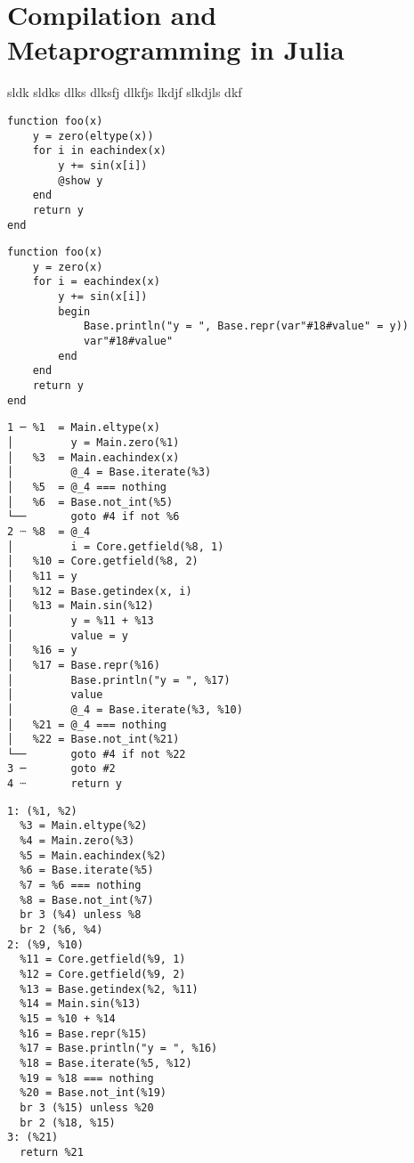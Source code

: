 \section{Compilation and Metaprogramming in Julia}
\label{sec:comp-metapr-julia}

sldk sldks dlks dlksfj dlkfjs lkdjf slkdjls dkf

\begin{lstlisting}
function foo(x)
    y = zero(eltype(x))
    for i in eachindex(x)
        y += sin(x[i])
        @show y
    end
    return y
end
\end{lstlisting}

\begin{lstlisting}
function foo(x)
    y = zero(x)
    for i = eachindex(x)
        y += sin(x[i])
        begin
            Base.println("y = ", Base.repr(var"#18#value" = y))
            var"#18#value"
        end
    end
    return y
end
\end{lstlisting}

\begin{lstlisting}
1 ─ %1  = Main.eltype(x)
│         y = Main.zero(%1)
│   %3  = Main.eachindex(x)
│         @_4 = Base.iterate(%3)
│   %5  = @_4 === nothing
│   %6  = Base.not_int(%5)
└──       goto #4 if not %6
2 ┄ %8  = @_4
│         i = Core.getfield(%8, 1)
│   %10 = Core.getfield(%8, 2)
│   %11 = y
│   %12 = Base.getindex(x, i)
│   %13 = Main.sin(%12)
│         y = %11 + %13
│         value = y
│   %16 = y
│   %17 = Base.repr(%16)
│         Base.println("y = ", %17)
│         value
│         @_4 = Base.iterate(%3, %10)
│   %21 = @_4 === nothing
│   %22 = Base.not_int(%21)
└──       goto #4 if not %22
3 ─       goto #2
4 ┄       return y
\end{lstlisting}

\begin{lstlisting}
1: (%1, %2)
  %3 = Main.eltype(%2)
  %4 = Main.zero(%3)
  %5 = Main.eachindex(%2)
  %6 = Base.iterate(%5)
  %7 = %6 === nothing
  %8 = Base.not_int(%7)
  br 3 (%4) unless %8
  br 2 (%6, %4)
2: (%9, %10)
  %11 = Core.getfield(%9, 1)
  %12 = Core.getfield(%9, 2)
  %13 = Base.getindex(%2, %11)
  %14 = Main.sin(%13)
  %15 = %10 + %14
  %16 = Base.repr(%15)
  %17 = Base.println("y = ", %16)
  %18 = Base.iterate(%5, %12)
  %19 = %18 === nothing
  %20 = Base.not_int(%19)
  br 3 (%15) unless %20
  br 2 (%18, %15)
3: (%21)
  return %21
\end{lstlisting}

